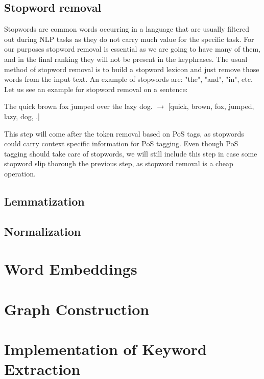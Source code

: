 \documentclass[12pt]{article}
\numberwithin{equation}{section}
\begin{document}
\begin{spacing}{1.5}
	\subsection{Stopword removal}
	Stopwords are common words occurring in a language that are usually filtered out during NLP tasks as they do not carry much value for the specific task. For our purposes stopword removal is essential as we are going to have many of them, and in the final ranking they will not be present in the keyphrases. The usual method of stopword removal is to build a stopword lexicon and just remove those words from the input text. An example of stopwords are: "the", "and", "in", etc. Let us see an example for stopword removal on a sentence:
	\begin{center}
		The quick brown fox jumped over the lazy dog. $\rightarrow$ [quick, brown, fox, jumped, lazy, dog, .]
	\end{center} 
	This step will come after the token removal based on PoS tags, as stopwords could carry context specific information for PoS tagging. Even though PoS tagging should take care of stopwords, we will still include this step in case some stopword slip thorough the previous step, as stopword removal is a cheap operation.
	
	\subsection{Lemmatization}
	
	\subsection{Normalization}
	
	 
	 
	 
	 
	 
	 
	 
	\newpage 
	\section{Word Embeddings}
	
	\section{Graph Construction}
	
	\section{Implementation of Keyword Extraction}
	

\end{spacing}
\end{document}
